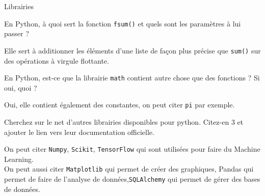 \begin{section}{Librairies}
\begin{solution}
    
\end{solution} 
\begin{Exercice}[5 minutes]
	En Python, à quoi sert la fonction \lstinline{fsum()} et quels sont les paramètres à lui passer ? 
\end{Exercice}
\begin{solution}
	Elle sert à additionner les éléments d'une liste de façon plus précise que \lstinline{sum()} sur des opérations à virgule flottante.
\end{solution} 
\begin{comment}
    \begin{Exercice}[5 minutes]
        Comment faire si je veux calculer la distance euclidienne entre 2 points ? 
    \end{Exercice} \\
    \begin{solution}
        Il faut utiliser la fonction dist(p,q). Attention, ici p et q sont les deux des listes de coordonnées !
    \end{solution} 
\end{comment}
\begin{Exercice}[5 minutes]
	En Python, est-ce que la librairie \lstinline{math} contient autre chose que des fonctions ? Si oui, quoi ? 
\end{Exercice} 
\begin{solution}
	Oui, elle contient également des constantes, on peut citer \lstinline{pi} par exemple.
\end{solution} 
\begin{Exercice}[10 minutes]
	Cherchez sur le net d'autres librairies disponibles pour python. Citez-en 3 et ajouter le lien vers leur documentation officielle.
\end{Exercice}    
\begin{solution}
	On peut citer \lstinline{Numpy}, \lstinline{Scikit}, \lstinline{TensorFlow} qui sont utilisées pour faire du Machine Learning. \\
	
	On peut aussi citer \lstinline{Matplotlib} qui permet de créer des graphiques, Pandas qui permet de faire de l'analyse de données,\lstinline{SQLAlchemy} qui permet de gérer des bases de données. \\
\end{solution} 
\end{section}

